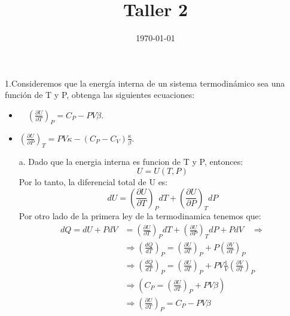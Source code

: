 \documentclass[a4paper]{article}
\date{\today}
\title{Taller 2}
\begin{document}
    \header{}

    
    1.Consideremos que la energía interna de un sistema termodinámico sea una función de T y P,
    obtenga las siguientes ecuaciones:
    \begin{itemize}
        \item  $\quad\left(\frac{\partial U}{\partial T}\right)_P=C_P-P V \beta$.
        \item $\left(\frac{\partial U}{\partial P}\right)_T=P V \kappa-\left(C_P-C_V\right) \frac{\kappa}{\beta}$.
    \end{itemize}
    \begin{answer}[Problema 1]
        \begin{itemize}
            \item[a.]Dado que la energia interna es funcion de T y P, entonces:
            \begin{equation}
                U=U(T,P)
            \end{equation}
            Por lo tanto, la diferencial total de U es:
            \begin{equation}
                dU=\left(\frac{\partial U}{\partial T}\right)_P dT+\left(\frac{\partial U}{\partial P}\right)_T dP
            \end{equation}
            Por otro lado de la primera ley de la termodinamica tenemos que:
            \begin{align*}
                d Q = dU + PdV &=\left( \frac{\partial U}{\partial T} \right)_P dT + \left( \frac{\partial U}{\partial P} \right)_T dP + PdV \quad \Rightarrow\\
                & \Rightarrow \left(
                    \frac{dQ}{dT}
                \right)_P = \left( \frac{\partial U}{\partial T} \right)_P + P \left( \frac{\partial V}{\partial T} \right)_P\\
                & \Rightarrow \left(
                    \frac{dQ}{dT}
                    \right)_P = \left( \frac{\partial U}{\partial T} \right)_P + PV \frac{1}{V} \left( \frac{\partial V}{\partial T} \right)_P\\
                & \Rightarrow \left(
                        C_P = \left( \frac{\partial U}{\partial T} \right)_P + PV \beta
                    \right)\\
                & \Rightarrow \left(
                    \frac{\partial U}{\partial T}
                    \right)_P = C_P - PV \beta
            \end{align*}   
    

\end{itemize}
\end{answer}
\end{document}
